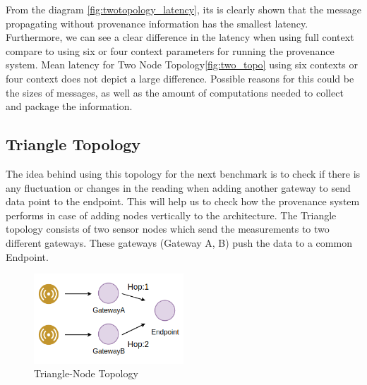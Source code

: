 From the diagram \ref{fig:twotopology_latency}, its is clearly shown that the message propagating without provenance information has the smallest latency. Furthermore, we can see a clear difference in the latency when using full context compare to using six or four context parameters for running the provenance system. Mean latency for Two Node Topology\ref{fig:two_topo} using six contexts or four context does not depict a large difference. Possible reasons for this could be the sizes of messages, as well as the amount of computations needed to collect and package the information.

\subsection*{Triangle Topology}The idea behind using this topology for the next benchmark is to check if there is any fluctuation or changes in the reading when adding another gateway to send data point to the endpoint. This will help us to check how the provenance system performs in case of adding nodes vertically to the architecture. The Triangle topology consists of two sensor nodes which send the measurements to two different gateways. These gateways (Gateway A, B) push the data to a common Endpoint.

\begin{figure}[H]
	\center
	\includegraphics[width=0.5\textwidth]{figures/latencytopo_triangle.png}
	\caption{Triangle-Node Topology}
	\label{fig:triangle_topo}
\end{figure}

